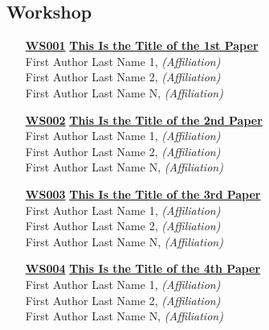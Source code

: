 \subsection{Workshop}
\begin{enumerate}
\item[\href{https://doi.org/10.1145/1122445.1122456}{\textbf{WS001}}]
\href{https://doi.org/10.1145/1122445.1122456}{\textbf{This Is the Title of the 1st Paper}}\\
First Author Last Name 1, \emph{(Affiliation)}\\
First Author Last Name 2, \emph{(Affiliation)}\\
First Author Last Name N, \emph{(Affiliation)}\\

\item[\href{https://doi.org/10.1145/1122445.1122456}{\textbf{WS002}}]
\href{https://doi.org/10.1145/1122445.1122456}{\textbf{This Is the Title of the 2nd Paper}}\\
First Author Last Name 1, \emph{(Affiliation)}\\
First Author Last Name 2, \emph{(Affiliation)}\\
First Author Last Name N, \emph{(Affiliation)}\\

\item[\href{https://doi.org/10.1145/1122445.1122456}{\textbf{WS003}}]
\href{https://doi.org/10.1145/1122445.1122456}{\textbf{This Is the Title of the 3rd Paper}}\\
First Author Last Name 1, \emph{(Affiliation)}\\
First Author Last Name 2, \emph{(Affiliation)}\\
First Author Last Name N, \emph{(Affiliation)}\\

\item[\href{https://doi.org/10.1145/1122445.1122456}{\textbf{WS004}}]
\href{https://doi.org/10.1145/1122445.1122456}{\textbf{This Is the Title of the 4th Paper}}\\
First Author Last Name 1, \emph{(Affiliation)}\\
First Author Last Name 2, \emph{(Affiliation)}\\
First Author Last Name N, \emph{(Affiliation)}\\
\end{enumerate}